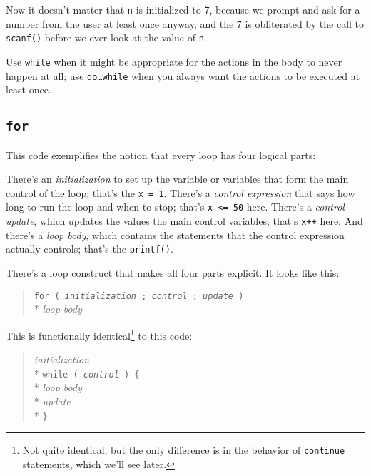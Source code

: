 \noindent Now it doesn't matter that {\tt n} is initialized to 7,
because we prompt and ask for a number from the user at least once
anyway, and the 7 is obliterated by the call to {\tt scanf()} before we
ever look at the value of {\tt n}.

Use {\tt while} when it might be appropriate for the actions in the body
to never happen at all; use {\tt do{\rm\ldots}while} when you always
want the actions to be executed at least once.

\subsection{{\tt for}}

This code exemplifies the notion that every loop has four logical
parts:


    There's an {\em initialization}\/ to set up the variable or
variables that form the main control of the loop; that's the {\tt x =
1}.  There's a {\em control expression}\/ that says how long to run the
loop and when to stop; that's {\tt x <= 50} here.  There's a {\em
control update}\/, which updates the values the main control variables;
that's {\tt x++} here.  And there's a {\em loop body}\/, which contains
the statements that the control expression actually controls; that's the
{\tt printf()}.

    There's a loop construct that makes all four parts explicit.  It
looks like this:

\begin{quote}
{\tt for ( {\em initialization}\/ ; {\em control}\/ ; {\em update}\/ ) } \\*
{\em \mbox{\hspace{.25in}} loop body}\/
\end{quote}

This is functionally identical\footnote{Not quite identical, but the
only difference is in the behavior of {\tt continue} statements, which
we'll see later.} to this code:

\begin{quote}
{\em initialization}\/ \\*
{\tt while ( {\em control} ) \{ } \\*
{\em \mbox{\hspace{.25in}} loop body}\/ \\*
{\em \mbox{\hspace{.25in}} update}\/ \\*
{\tt \} }
\end{quote}

